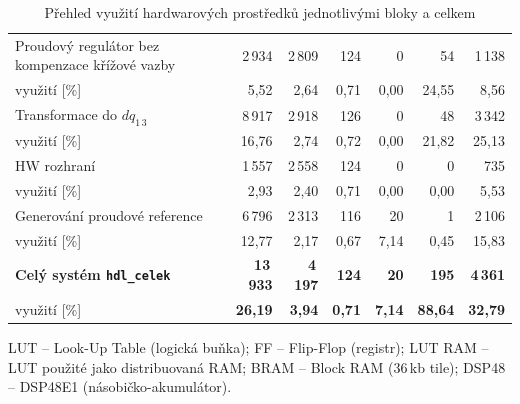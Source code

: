 \begin{table}[htbp]
\begin{threeparttable}
\begin{tabular}{p{4.5cm}rrrrrr}
    \addlinespace
    Proudový regulátor bez kompenzace křížové vazby
    & 2\,934 & 2\,809 & 124 & 0 & 54 & 1\,138 \\
    \quad využití [\%]
    & 5{,}52 & 2{,}64 & 0{,}71 & 0{,}00 & 24{,}55 & 8{,}56 \\
    \addlinespace
    Transformace do $dq_{1\,3}$
    & 8\,917 & 2\,918 & 126 & 0 & 48 & 3\,342 \\
    \quad využití [\%]
    & 16{,}76 & 2{,}74 & 0{,}72 & 0{,}00 & 21{,}82 & 25{,}13 \\
    \addlinespace
    HW rozhraní 
    & 1\,557 & 2\,558 & 124 & 0 & 0 & 735 \\
    \quad využití [\%]
    & 2{,}93 & 2{,}40 & 0{,}71 & 0{,}00 & 0{,}00 & 5{,}53 \\
    \addlinespace
    Generování proudové reference
    & 6\,796 & 2\,313 & 116 & 20
    & 1 & 2\,106 \\
    \quad využití [\%]
    & 12{,}77 & 2{,}17 & 0{,}67 & 7{,}14 & 0{,}45 & 15{,}83 \\
    \addlinespace
    \textbf{Celý systém \texttt{hdl\_celek}}
    & \textbf{13\,933} & \textbf{4\,197} & \textbf{124} & \textbf{20} & \textbf{195} & \textbf{4\,361} \\
    \quad využití [\%]
    & \textbf{26{,}19} & \textbf{3{,}94} & \textbf{0{,}71} & \textbf{7{,}14} & \textbf{88{,}64} & \textbf{32{,}79} \\

    \bottomrule
\end{tabular}
\begin{tablenotes}
    \small
    \item LUT – Look-Up Table (logická buňka); FF – Flip-Flop (registr);
    LUT RAM – LUT použité jako distribuovaná RAM;
    BRAM – Block RAM (36\,kb tile); DSP48 – DSP48E1 (násobičko-akumulátor).
\end{tablenotes}
\end{threeparttable}
\caption{Přehled využití hardwarových prostředků jednotlivými bloky a celkem}
\label{tab:hw_utilization_summary}
\end{table}



